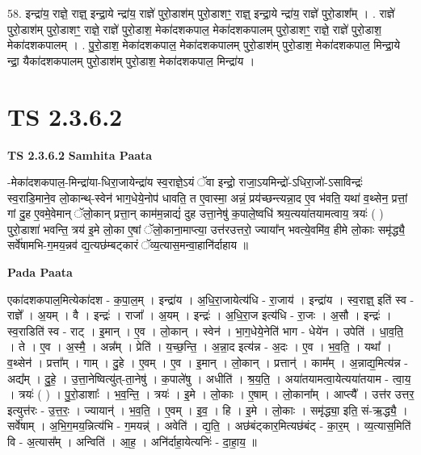 \documentclass[17pt]{extarticle}
\begin{document}
58. इन्द्रा॑य॒ राज्ञे॒ राज्ञ्॒ इन्द्रा॒ये न्द्रा॑य॒ राज्ञे॑ पुरो॒डाश॑म् पुरो॒डाशꣳ॒॒ राज्ञ्॒ इन्द्रा॒ये न्द्रा॑य॒ राज्ञे॑ पुरो॒डाश᳚म् । . राज्ञे॑ पुरो॒डाश॑म् पुरो॒डाशꣳ॒॒ राज्ञे॒ राज्ञे॑ पुरो॒डाश॒ मेका॑दशकपाल॒ मेका॑दशकपालम् पुरो॒डाशꣳ॒॒ राज्ञे॒ राज्ञे॑ पुरो॒डाश॒ मेका॑दशकपालम् । . पु॒रो॒डाश॒ मेका॑दशकपाल॒ मेका॑दशकपालम् पुरो॒डाश॑म् पुरो॒डाश॒ मेका॑दशकपाल॒ मिन्द्रा॒ये न्द्रा॒ यैका॑दशकपालम् पुरो॒डाश॑म् पुरो॒डाश॒ मेका॑दशकपाल॒ मिन्द्रा॑य । \newline
\pagebreak
{}

\section{ TS 2.3.6.2 }

\textbf{TS 2.3.6.2 } \newline
\textbf{Samhita Paata} \newline

-मेका॑दशकपाल॒-मिन्द्रा॑या-धिरा॒जायेन्द्रा॑य स्व॒राज्ञे॒ऽयं ॅवा इन्द्रो॒ राजा॒ऽयमिन्द्रो॑-ऽधिरा॒जो॑-ऽसाविन्द्रः॑ स्व॒राडि॒माने॒व लो॒कान्थ्-स्वेन॑ भाग॒धेये॒नोप॑ धावति॒ त ए॒वास्मा॒ अन्नं॒ प्रय॑च्छन्त्यन्ना॒द ए॒व भ॑वति॒ यथा॑ व॒थ्सेन॒ प्रत्तां॒ गां दु॒ह ए॒वमे॒वेमान् ॅलो॒कान् प्रत्ता॒न् काम॑म॒न्नाद्यं॑ दुह उत्ता॒नेषु॑ क॒पाले॒ष्वधि॑ श्रय॒त्यया॑तयामत्वाय॒ त्रयः॑ ( ) पुरो॒डाशा॑ भवन्ति॒ त्रय॑ इ॒मे लो॒का ए॒षां ॅलो॒काना॒माप्त्या॒ उत्त॑र‌उत्तरो॒ ज्याया᳚न् भवत्ये॒वमि॑व॒ हीमे लो॒काः समृ॑द्ध्यै॒ सर्वे॑षामभि-ग॒मय॒न्नव॑ द्य॒त्यछ॑म्बट्कारं ॅव्य॒त्यास॒मन्वा॒हानि॑र्दाहाय ॥ \newline

\textbf{Pada Paata} \newline

एका॑दशकपाल॒मित्येका॑दश - क॒पा॒ल॒म् । इन्द्रा॑य । अ॒धि॒रा॒जायेत्य॑धि - रा॒जाय॑ । इन्द्रा॑य । स्व॒राज्ञ्॒ इति॑ स्व - राज्ञे᳚ । अ॒यम् । वै । इन्द्रः॑ । राजा᳚ । अ॒यम् । इन्द्रः॑ । अ॒धि॒रा॒ज इत्य॑धि - रा॒जः । अ॒सौ । इन्द्रः॑ । स्व॒राडिति॑ स्व - राट् । इ॒मान् । ए॒व । लो॒कान् । स्वेन॑ । भा॒ग॒धेये॒नेति॑ भाग - धेये॑न । उपेति॑ । धा॒व॒ति॒ । ते । ए॒व । अ॒स्मै॒ । अन्न᳚म् । प्रेति॑ । य॒च्छ॒न्ति॒ । अ॒न्ना॒द इत्य॑न्न - अ॒दः । ए॒व । भ॒व॒ति॒ । यथा᳚ । व॒थ्सेन॑ । प्रत्ता᳚म् । गाम् । दु॒हे । ए॒वम् । ए॒व ।  इ॒मान् । लो॒कान् । प्रत्तान्॑ । काम᳚म् । अ॒न्नाद्य॒मित्य॑न्न - अद्य᳚म् । दु॒हे॒ । उ॒त्ता॒नेष्वित्यु॑त्-ता॒नेषु॑ । क॒पाले॑षु । अधीति॑ । श्र॒य॒ति॒ । अया॑तयामत्वा॒येत्यया॑तयाम - त्वा॒य॒ । त्रयः॑ ( ) । पु॒रो॒डाशाः᳚ । भ॒व॒न्ति॒ । त्रयः॑ । इ॒मे । लो॒काः । ए॒षाम् । लो॒काना᳚म् । आप्त्यै᳚ । उत्त॑र उत्तर॒ इत्युत्त॑रः - उ॒त्त॒रः॒ । ज्यायान्॑ । भ॒व॒ति॒ । ए॒वम् । इ॒व॒ । हि । इ॒मे । लो॒काः । समृ॑द्ध्या॒ इति॒ सं-ऋ॒द्ध्यै॒ ।  सर्वे॑षाम् । अ॒भि॒ग॒मय॒न्नित्य॑भि - ग॒मयन्न्॑ । अवेति॑ । द्य॒ति॒ । अछ॑बंट्कार॒मित्यछ॑बंट् - का॒र॒म् । व्य॒त्यास॒मिति॑ वि - अ॒त्यास᳚म् । अन्विति॑ । आ॒ह॒ । अनि॑र्दाहा॒येत्यनिः॑ - दा॒हा॒य॒ ॥  \newline
\end{document}
